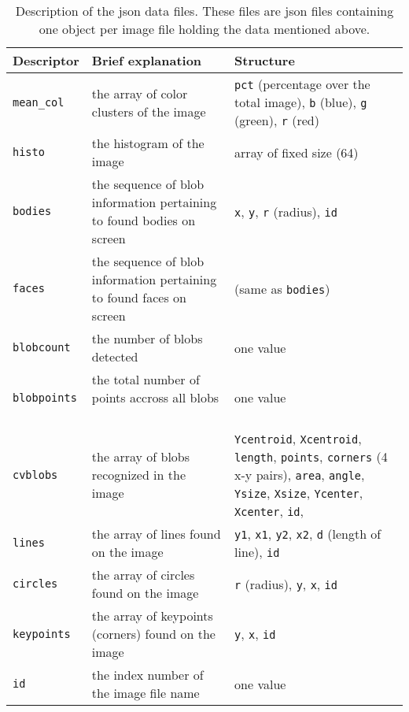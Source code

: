 \begin{table}
\begin{tabular}{ l | p{6cm} |   p{6cm} }

Descriptor & Brief explanation & Structure

\tabularnewline
\hline

\texttt{mean\_col}  & the array of color clusters of the image \
& 
\texttt{pct} (percentage over the total image), 
\texttt{b} (blue), 
\texttt{g} (green), 
\texttt{r} (red)

\tabularnewline
\hline

\texttt{histo}      & the histogram of the image \
& array of fixed size (64)

\tabularnewline
\hline

\texttt{bodies}     & the sequence of blob information pertaining to found bodies on screen \
& 
\texttt{x}, 
\texttt{y}, 
\texttt{r} (radius), 
\texttt{id}

\tabularnewline
\hline

\texttt{faces}      & the sequence of blob information pertaining to found faces on screen \
& (same as \texttt{bodies})

\tabularnewline
\hline

\texttt{blobcount}  & the number of blobs detected \
& one value

\tabularnewline
\hline

\texttt{blobpoints} & the total number of points accross all blobs \
& one value

\tabularnewline
\hline

\texttt{cvblobs}    & the array of blobs recognized in the image \ 
& 
\texttt{Ycentroid}, 
\texttt{Xcentroid}, 
\texttt{length}, 
\texttt{points}, 
\texttt{corners} (4 x-y pairs), 
\texttt{area}, 
\texttt{angle}, 
\texttt{Ysize}, 
\texttt{Xsize}, 
\texttt{Ycenter}, 
\texttt{Xcenter}, 
\texttt{id}, 

\tabularnewline
\hline

\texttt{lines}      & the array of lines found on the image \
& 
\texttt{y1}, 
\texttt{x1},
\texttt{y2}, 
\texttt{x2}, 
\texttt{d} (length of line), 
\texttt{id}

\tabularnewline
\hline

\texttt{circles}    & the array of circles found on the image \
&
\texttt{r} (radius), 
\texttt{y}, 
\texttt{x}, 
\texttt{id}

\tabularnewline
\hline

\texttt{keypoints}  & the array of keypoints (corners) found on the image \
& 
\texttt{y},  
\texttt{x}, 
\texttt{id} 

\tabularnewline
\hline

\texttt{id}  & the index number of the image file name \
& one value


\end{tabular}
\caption{Description of the \gls{json} data files. These files are \gls{json} files containing one object per image file holding the data mentioned above. }
\label{tab:jsondatafiles}
\end{table}





